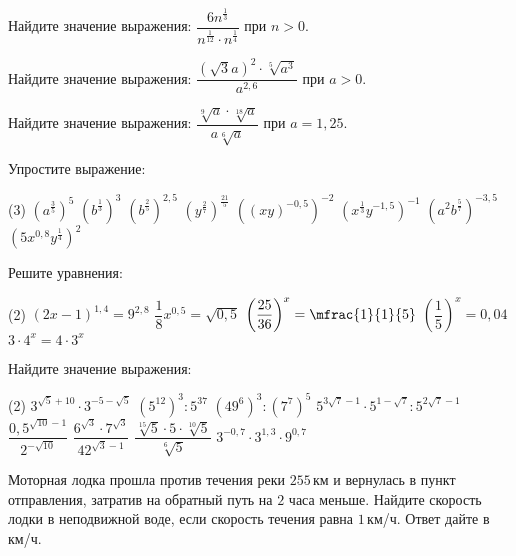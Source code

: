 \begin{class}[number=4]
\begin{listofex}
\begin{tasks}
		\end{tasks}
		\item Найдите значение выражения: \( \dfrac{6n^{\tfrac{1}{3}}}{n^{\tfrac{1}{12}} \cdot n^ {\tfrac{1}{4}}} \) при \( n>0 \).
		\item Найдите значение выражения: \( \dfrac{(\sqrt{3}a)^2 \cdot \sqrt[5]{a^3}}{a^{2,6}} \) при \( a>0 \).
		\item Найдите значение выражения: \( \dfrac{\sqrt[9]{a} \cdot \sqrt[18]{a}}{a\sqrt[6]{a}} \) при \( a=1,25 \).
	\end{listofex}
\end{class}

\begin{homework}[number=2]
	\begin{listofex}
		\item Упростите выражение:
		\begin{tasks}(3)
			\task \( (a^{\tfrac{3}{5}})^5 \)
			\task \( (b^{\tfrac{1}{3}})^3 \)
			\task \( (b^{\tfrac{2}{5}})^{2,5} \)
			\task \( (y^{\tfrac{2}{7}})^{\tfrac{21}{5}} \)
			\task \( ((xy)^{-0,5})^{-2} \)
			\task \( (x^{\tfrac{1}{3}}y^{-1,5})^{-1} \)
			\task \( (a^{2}b^{\tfrac{5}{7}})^{-3,5} \)
			\task \( (5x^{0,8}y^{\tfrac{1}{4}})^{2} \)
		\end{tasks}
		\item Решите уравнения:
		\begin{tasks}(2)
			\task \( (2x-1)^{1,4}=9^{2,8} \)
			\task \( \dfrac{1}{8}x^{0,5} = \sqrt{0,5} \)
			\task \( \left( \dfrac{25}{36} \right)^x=\mfrac{1}{1}{5} \)
			\task \( \left( \dfrac{1}{5} \right)^x=0,04 \)
			\task \( 3 \cdot 4^x = 4 \cdot 3^x \)
		\end{tasks}
		\item Найдите значение выражения:
		\begin{tasks}(2)
			\task \( 3^{\sqrt{5}+10}\cdot3^{-5-\sqrt{5}} \)
			\task \( (5^{12})^3 : 5^{37} \)
			\task \( (49^6)^3:(7^7)^5 \)
			\task \( 5^{3\sqrt{7}-1}\cdot 5^{1-\sqrt{7}}:5^{2\sqrt{7}-1} \)
			\task \( \dfrac{0,5^{\sqrt{10}-1}}{2^{-\sqrt{10}}} \)
			\task \( \dfrac{6^{\sqrt{3}}\cdot7^{\sqrt{3}}}{42^{\sqrt{3}-1}} \)
			\task \( \dfrac{\sqrt[15]{5}\cdot5\cdot\sqrt[10]{5}}{\sqrt[6]{5}} \)
			\task \( 3^{-0,7}\cdot 3^{1,3} \cdot 9^{0,7}\)
		\end{tasks}
		\item Моторная лодка прошла против течения реки \(255\) км и вернулась в пункт отправления, затратив на обратный путь на \(2\) часа меньше. Найдите скорость лодки в неподвижной воде, если скорость течения равна \(1\) км/ч. Ответ дайте в км/ч.
	\end{listofex}
\end{homework}

